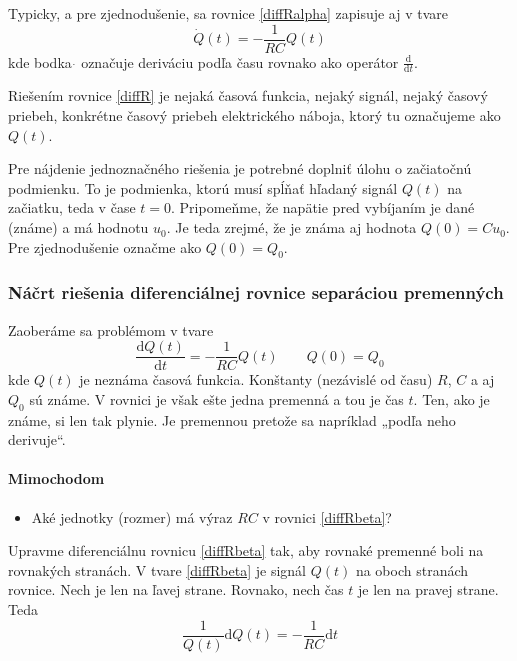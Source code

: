 \documentclass[a4paper, 10pt, ]{article}
\begin{document}
Typicky, a pre zjednodušenie, sa rovnice \eqref{diffRalpha} zapisuje aj v tvare
\begin{equation} \label{diffR}
    \dot Q(t) = - \frac{1}{RC} Q(t)
\end{equation}
kde bodka $\dot{}$ označuje deriváciu podľa času rovnako ako operátor $\frac{\text{d}}{\text{d}t}$.


\bigskip

Riešením rovnice \eqref{diffR} je nejaká časová funkcia, nejaký signál, nejaký časový priebeh, konkrétne časový priebeh elektrického náboja, ktorý tu označujeme ako $Q(t)$.

Pre nájdenie jednoznačného riešenia je potrebné doplniť úlohu o začiatočnú podmienku. To je podmienka, ktorú musí spĺňať hľadaný signál $Q(t)$ na začiatku, teda v čase $t=0$. Pripomeňme, že napätie pred vybíjaním je dané (známe) a má hodnotu $u_0$. Je teda zrejmé, že je známa aj hodnota $Q(0) = C u_0$. Pre zjednodušenie označme ako $Q(0) = Q_0$.



\subsubsection{Náčrt riešenia diferenciálnej rovnice separáciou premenných}

Zaoberáme sa problémom v tvare
\begin{equation} \label{diffRbeta}
    \frac{\text{d}Q(t)}{\text{d}t} = - \frac{1}{RC} Q(t) \qquad Q(0) = Q_0
\end{equation}
kde $Q(t)$ je neznáma časová funkcia. Konštanty (nezávislé od času) $R$, $C$ a aj $Q_0$ sú známe. V rovnici je však ešte jedna premenná a tou je čas $t$. Ten, ako je známe, si len tak plynie. Je premennou pretože sa napríklad „podľa neho derivuje“.




\noindent
\hrulefill

\paragraph{Mimochodom}
\begin{itemize}
    \item Aké jednotky (rozmer) má výraz $RC$ v rovnici \eqref{diffRbeta}?
\end{itemize}
\noindent
\hrulefill

\medskip

Upravme diferenciálnu rovnicu \eqref{diffRbeta} tak, aby rovnaké premenné boli na rovnakých stranách. V tvare \eqref{diffRbeta} je signál $Q(t)$ na oboch stranách rovnice. Nech je len na ľavej strane. Rovnako, nech čas $t$ je len na pravej strane. Teda
\begin{equation} \label{diffRbeta2}
    \frac{1}{Q(t)}\text{d}Q(t) = - \frac{1}{RC} \text{d}t
\end{equation}
\end{document}
